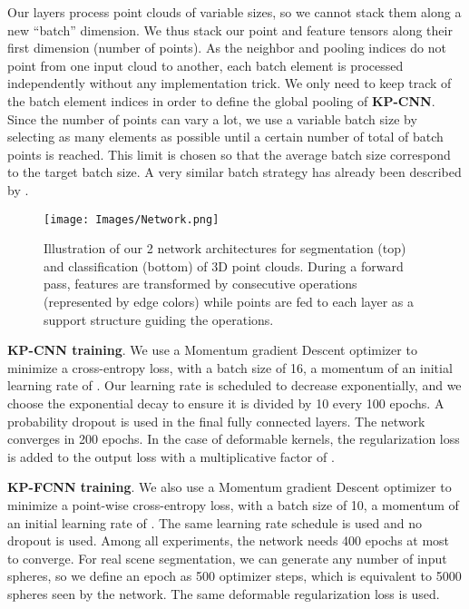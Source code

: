 \documentclass[10pt,twocolumn,letterpaper]{article}
\begin{document}
Our layers process point clouds of variable sizes, so we cannot stack them along a new ``batch'' dimension. We thus stack our point and feature tensors along their first dimension (number of points). As the neighbor and pooling indices do not point from one input cloud to another, each batch element is processed independently without any implementation trick. We only need to keep track of the batch element indices in order to define the global pooling of \textbf{KP-CNN}. Since the number of points can vary a lot, we use a variable batch size by selecting as many elements as possible until a certain number of total of batch points is reached. This limit is chosen so that the average batch size correspond to the target batch size. A very similar batch strategy has already been described by \cite{hermosilla2018monte}.

\begin{figure*}[t]
    \vspace{1ex}
    \centering
    \texttt{[image: Images/Network.png]}
    \caption{Illustration of our 2 network architectures for segmentation (top) and classification (bottom) of 3D point clouds. During a forward pass, features are transformed by consecutive operations (represented by edge colors) while points are fed to each layer as a support structure guiding the operations.}
    \label{fig_networks}
    \vspace{1ex}
\end{figure*}

\noindent
\textbf{KP-CNN training}. We use a Momentum gradient Descent optimizer to minimize a cross-entropy loss, with a batch size of 16, a momentum of  an initial learning rate of . Our learning rate is scheduled to decrease exponentially, and we choose the exponential decay to ensure it is divided by 10 every 100 epochs. A  probability dropout is used in the final fully connected layers. The network converges in 200 epochs. In the case of deformable kernels, the regularization loss is added to the output loss with a multiplicative factor of .

\noindent
\textbf{KP-FCNN training}. We also use a Momentum gradient Descent optimizer to minimize a point-wise cross-entropy loss, with a batch size of 10, a momentum of  an initial learning rate of . The same learning rate schedule is used and no dropout is used. Among all experiments, the network needs 400 epochs at most to converge. For real scene segmentation, we can generate any number of input spheres, so we define an epoch as 500 optimizer steps, which is equivalent to 5000 spheres seen by the network. The same deformable regularization loss is used.
\end{document}
